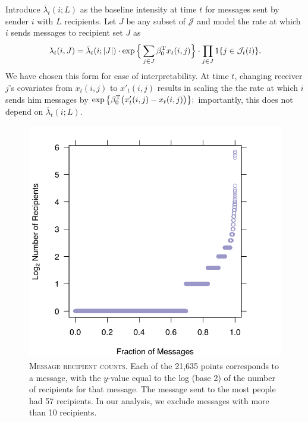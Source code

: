 \documentclass[aoas,preprint]{imsart}
\begin{document}
Introduce $\bar \lambda_t(i ; L)$ as the baseline intensity at time $t$ for
messages sent by sender $i$ with $L$ recipients.  Let $J$ be any
subset of $\mathcal{J}$ and model the rate at which $i$ sends messages to
recipient set $J$ as
\begin{equation}\label{E:intensity-multiple}
    \lambda_t(i,J)
        =
        \bar \lambda_t(i ; |J|)
        \cdot
        \exp\Big\{
            \sum_{j \in J}
                \beta_0^\trans  x_t(i,j)
        \Big\}
        \cdot
        \prod_{j \in J}
        1\{ j \in \mathcal{J}_t(i) \}
        .
\end{equation}
We have chosen this form for ease of interpretability.  At time
$t$, changing receiver $j$'s covariates from $x_t(i,j)$ to
$x'_t(i,j)$ results in scaling the the rate at
which $i$ sends him messages by
\(
    \exp\big\{ \beta_0^{\mathrm{T}} \big(x'_t(i,j) - x_t(i,j)\big) \big\};
\)
importantly, this does not depend on $\bar \lambda_t(i; L)$.

\begin{figure}
    \includegraphics[scale=0.6]{figures/recipient-counts}
    \caption{
        \textsc{Message recipient counts.}
        Each of the 21,635 points corresponds to a message, with the
        $y$-value equal to the log (base 2) of the number of recipients
        for that message.  The message sent to the most people
        had 57 recipients.  In our analysis, we exclude messages with more
        than 10 recipients.
    }\label{F:recipient-counts}
\end{figure}
\end{document}
